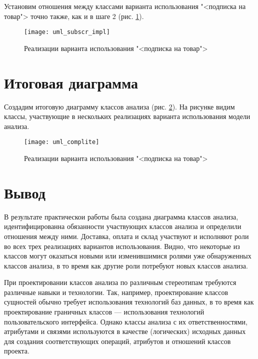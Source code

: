 Установим отношения между классами варианта использования "<подписка на товар">
точно также, как и в шаге 2 (рис. \ref{fig:subscription:impl}).
\begin{figure}[h!tp]
	\centering
	\texttt{[image: uml\_subscr\_impl]}
	\caption{Реализации варианта использования "<подписка на товар">}
	\label{fig:subscription:impl}
\end{figure}

\section{Итоговая диаграмма}
Создадим итоговую диаграмму классов анализа (рис. \ref{fig:complite}).
На рисунке видим классы, участвующие в нескольких реализациях варианта
использования модели анализа.
\begin{figure}[h!tp]
	\centering
	\texttt{[image: uml\_complite]}
	\caption{Реализации варианта использования "<подписка на товар">}
	\label{fig:complite}
\end{figure}

\newpage

\section*{\LARGE Вывод}
В результате практическои работы была создана диаграмма классов анализа,
идентифицированна обязанности участвующих классов анализа и определили
отношения между ними. Доставка, оплата и склад участвуют и
исполняют роли во всех трех реализациях вариантов использования. Видно,
что некоторые из классов могут оказаться новыми или изменившимися ролями
уже обнаруженных классов анализа, в то время как другие роли потребуют
новых классов анализа.\par
При проектировании классов анализа по различным стереотипам требуются
различные навыки и технологии. Так, например, проектирование классов
сущностей обычно требует использования технологий баз данных, в то время
как проектирование граничных классов — использования технологий
пользовательского интерфейса. Однако классы анализа с их ответственностями,
атрибутами и связями используются в качестве (логических) исходных данных
для создания соответствующих операций, атрибутов и отношений классов
проекта.
